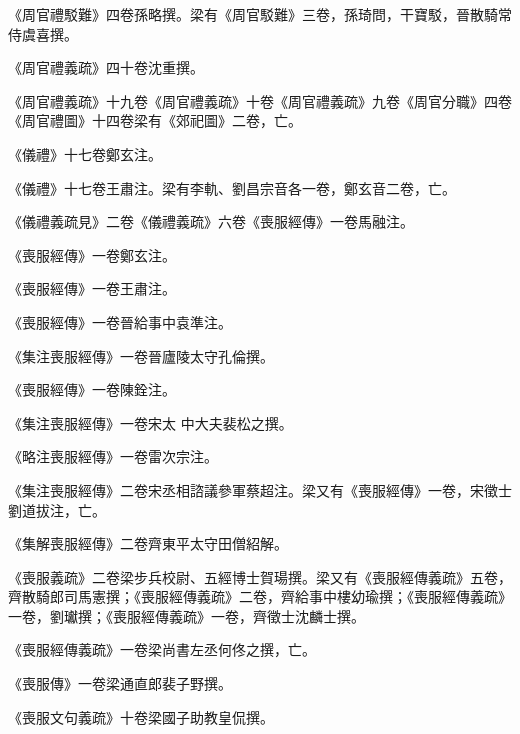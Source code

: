 \begin{pinyinscope}
 《周官禮駁難》四卷孫略撰。梁有《周官駁難》三卷，孫琦問，干寶駁，晉散騎常侍虞喜撰。



 《周官禮義疏》四十卷沈重撰。



 《周官禮義疏》十九卷《周官禮義疏》十卷《周官禮義疏》九卷《周官分職》四卷《周官禮圖》十四卷梁有《郊祀圖》二卷，亡。



 《儀禮》十七卷鄭玄注。



 《儀禮》十七卷王肅注。梁有李軌、劉昌宗音各一卷，鄭玄音二卷，亡。



 《儀禮義疏見》二卷《儀禮義疏》六卷《喪服經傳》一卷馬融注。



 《喪服經傳》一卷鄭玄注。



 《喪服經傳》一卷王肅注。



 《喪服經傳》一卷晉給事中袁準注。



 《集注喪服經傳》一卷晉廬陵太守孔倫撰。



 《喪服經傳》一卷陳銓注。



 《集注喪服經傳》一卷宋太
 中大夫裴松之撰。



 《略注喪服經傳》一卷雷次宗注。



 《集注喪服經傳》二卷宋丞相諮議參軍蔡超注。梁又有《喪服經傳》一卷，宋徵士劉道拔注，亡。



 《集解喪服經傳》二卷齊東平太守田僧紹解。



 《喪服義疏》二卷梁步兵校尉、五經博士賀瑒撰。梁又有《喪服經傳義疏》五卷，齊散騎郎司馬憲撰；《喪服經傳義疏》二卷，齊給事中樓幼瑜撰；《喪服經傳義疏》一卷，劉瓛撰；《喪服經傳義疏》一卷，齊徵士沈麟士撰。



 《喪服經傳義疏》一卷梁尚書左丞何佟之撰，亡。



 《喪服傳》一卷梁通直郎裴子野撰。



 《喪服文句義疏》十卷梁國子助教皇侃撰。




\end{pinyinscope}
